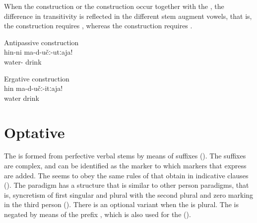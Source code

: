 When the  construction or the  construction occur together with the , the difference in transitivity is reflected in the different stem augment vowels, that is, the  construction requires  , whereas the  construction requires  .
%
\begin{exe}
	\ex
	\begin{xlist}
		\ex	\label{ex:Do not drink water (regularly)}
		Antipassive construction\\
		\gll	hin-ni	ma-d-učː-utːaja!\\
			water-	drink\\
		\glt	{}
	
		\ex	\label{Do not drink the water}
		Ergative construction\\
		\gll	hin	ma-d-učː-itːaja!\\
			water	drink\\
		\glt	{}
	\end{xlist}
\end{exe}



\section{Optative}
\label{sec:optative}

The  is formed from perfective verbal stems by means of suffixes (). The suffixes are complex, and  can be identified as the  marker to which markers that express  are added. The  seems to obey the same rules of  that obtain in indicative clauses (). The paradigm has a structure that is similar to other person paradigms, that is, syncretism of first singular and plural with the second plural and zero marking in the third person (). There is an optional variant  when the  is plural. The  is negated by means of the prefix , which is also used for the  ().

